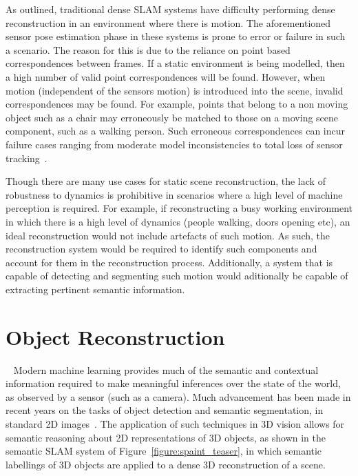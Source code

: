 As outlined, traditional dense SLAM systems have difficulty performing dense reconstruction in an 
environment where there is motion. The aforementioned sensor pose estimation phase in these systems
is prone to error or failure in such a scenario. The reason for this is due to the reliance on point based 
correspondences between frames. If a static environment is being modelled, then a high number of valid point 
correspondences will be found. However, when motion (independent of the sensors motion) is introduced into 
the scene, invalid correspondences may be found. For example, points that belong to a non moving object 
such as a chair may erroneously be matched to those on a moving scene component, such as a walking person.
Such erroneous correspondences can incur failure cases ranging from moderate model inconsistencies to total 
loss of sensor tracking~\cite{Newcombe2015}.

Though there are many use cases for static scene reconstruction, the lack of robustness to dynamics is 
prohibitive in scenarios where a high level of machine perception is required. For example, if 
reconstructing a busy working environment in which there is a high level of dynamics (people walking, 
doors opening etc), an ideal reconstruction would not include artefacts of such motion. As such, the 
reconstruction system would be required to identify such components and account for them in the 
reconstruction process. Additionally, a system that is capable of detecting and segmenting such motion 
would  aditionally be capable of extracting pertinent semantic information.

\section{Object Reconstruction}
~\label{sec:intro_object_recon}
Modern machine learning provides much of the semantic and contextual information required to make meaningful 
inferences over the state of the world, as observed by a sensor (such as a camera). Much advancement 
has been made in recent years on the tasks of object detection and semantic segmentation, in standard 2D 
images~\cite{Girshick2014,Shelhamer2017,Civera2011}. The application of such techniques in 3D vision allows 
for semantic reasoning about 2D representations of 3D objects, as shown in the semantic SLAM system of 
Figure~\ref{figure:spaint_teaser}, in which semantic labellings of 3D objects are applied to a 
dense 3D reconstruction of a scene.

